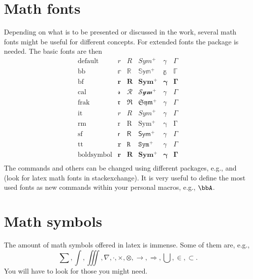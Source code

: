 
\section{Math fonts}

Depending on what is to be presented or discussed in the work, several math fonts might be useful for different concepts. For extended fonts the package  is needed. The basic fonts are then
\[
	\begin{array}{lccccc}
	\text{default} & r & R & Sym^+ & \gamma & \Gamma \\
	\text{bb} & \mathbb{r} & \mathbb{R} & \mathbb{Sym^+} & \mathbb{\gamma}& \mathbb{\Gamma} \\ 
	\text{bf} & \mathbf{r} & \mathbf{R} & \mathbf{Sym^+} & \mathbf{\gamma}& \mathbf{\Gamma} \\
	\text{cal} & \mathcal{r} & \mathcal{R} & \mathcal{Sym^+} & \mathcal{\gamma}& \mathcal{\Gamma} \\
	\text{frak} & \mathfrak{r} & \mathfrak{R} & \mathfrak{Sym^+} & \mathfrak{\gamma}& \mathfrak{\Gamma} \\
	\text{it} & \mathit{r} & \mathit{R} & \mathit{Sym^+} & \mathit{\gamma}& \mathit{\Gamma} \\
	\text{rm} & \mathrm{r} & \mathrm{R} & \mathrm{Sym^+} & \mathrm{\gamma}& \mathrm{\Gamma} \\
	\text{sf} & \mathsf{r} & \mathsf{R} & \mathsf{Sym^+} & \mathsf{\gamma}& \mathsf{\Gamma} \\
	\text{tt} & \mathtt{r} & \mathtt{R} & \mathtt{Sym^+} & \mathtt{\gamma}& \mathtt{\Gamma} \\
	\text{boldsymbol} & \boldsymbol{r} & \boldsymbol{R} & \boldsymbol{Sym^+} & \boldsymbol{\gamma}& \boldsymbol{\Gamma} \\
	\end{array}
\]
The commands  and others can be changed using different packages, e.g.,  and  (look for latex math fonts in stackexchange). It is very useful to define the most used fonts as new commands within your personal macros, e.g., $\bbA$.


\section{Math symbols}
\label{math_msymb}

The amount of math symbols offered in latex is immense. Some of them are, e.g., 
\begin{equation}
	\sum , \int , \iiint , \nabla , \cdot , \times , \otimes , \rightarrow , \Rightarrow , \bigcup , \in , \subset .
\end{equation}
You will have to look for those you might need.